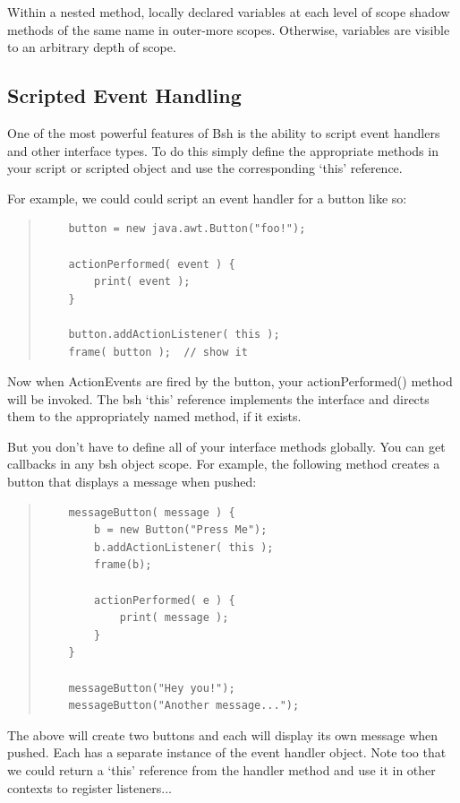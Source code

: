 \documentclass[twoside,11pt]{article}
\renewcommand{\_}{\texttt{\symbol{95}}}
\begin{document}
Within a nested method, locally declared variables at each level of
scope shadow methods of the same name in outer-more scopes.
Otherwise, variables are visible to an arbitrary depth of scope.

\subsection{Scripted Event Handling}

One of the most powerful features of Bsh is the ability to script
event handlers and other interface types.  To do this simply define
the appropriate methods in your script or scripted object and use the
corresponding `this' reference.

For example, we could could script an event handler for a button like so:
\begin{quote}
\begin{verbatim}
    button = new java.awt.Button("foo!");

    actionPerformed( event ) {
        print( event );
    }

    button.addActionListener( this );
    frame( button );  // show it
\end{verbatim}
\end{quote}
Now when ActionEvents are fired by the button, your actionPerformed()
method will be invoked.  The bsh `this' reference implements
the interface and directs them to the appropriately named method, if it exists.

But you don't have to define all of your interface methods globally.
You can get callbacks in any bsh object scope.  For example, the following
method creates a button that displays a message when pushed:
\begin{quote}
\begin{verbatim}
    messageButton( message ) {
        b = new Button("Press Me");
        b.addActionListener( this );
        frame(b);

        actionPerformed( e ) {
            print( message );
        }
    }

    messageButton("Hey you!");
    messageButton("Another message...");
\end{verbatim}
\end{quote}
The above will create two buttons and each will display its own message
when pushed.  Each has a separate instance of the event handler object.
Note too that we could return a `this' reference from the handler method and
use it in other contexts to register listeners...
\end{document}
